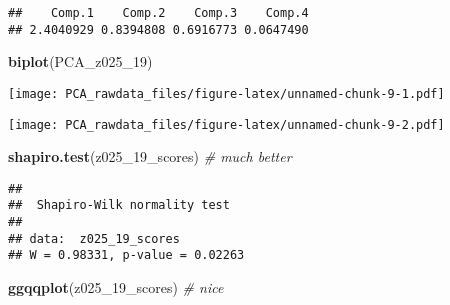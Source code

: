 \documentclass[]{article}
\newenvironment{Shaded}{\begin{snugshade}}{\end{snugshade}}
\newcommand{\CommentTok}[1]{\textcolor[rgb]{0.56,0.35,0.01}{\textit{#1}}}
\newcommand{\DecValTok}[1]{\textcolor[rgb]{0.00,0.00,0.81}{#1}}
\newcommand{\KeywordTok}[1]{\textcolor[rgb]{0.13,0.29,0.53}{\textbf{#1}}}
\newcommand{\NormalTok}[1]{#1}
\newcommand{\OperatorTok}[1]{\textcolor[rgb]{0.81,0.36,0.00}{\textbf{#1}}}
\newcommand{\StringTok}[1]{\textcolor[rgb]{0.31,0.60,0.02}{#1}}
\begin{document}
\begin{Shaded}
\end{Shaded}

\begin{verbatim}
##    Comp.1    Comp.2    Comp.3    Comp.4 
## 2.4040929 0.8394808 0.6916773 0.0647490
\end{verbatim}

\begin{Shaded}
\begin{Highlighting}[]
\KeywordTok{biplot}\NormalTok{(PCA_z025_}\DecValTok{19}\NormalTok{)}
\end{Highlighting}
\end{Shaded}

\texttt{[image: PCA\_rawdata\_files/figure-latex/unnamed-chunk-9-1.pdf]}

\begin{Shaded}
\end{Shaded}

\texttt{[image: PCA\_rawdata\_files/figure-latex/unnamed-chunk-9-2.pdf]}

\begin{Shaded}
\begin{Highlighting}[]
\KeywordTok{shapiro.test}\NormalTok{(z025_}\DecValTok{19}\NormalTok{_scores) }\CommentTok{# much better}
\end{Highlighting}
\end{Shaded}

\begin{verbatim}
## 
##  Shapiro-Wilk normality test
## 
## data:  z025_19_scores
## W = 0.98331, p-value = 0.02263
\end{verbatim}

\begin{Shaded}
\begin{Highlighting}[]
\KeywordTok{ggqqplot}\NormalTok{(z025_}\DecValTok{19}\NormalTok{_scores) }\CommentTok{# nice}
\end{Highlighting}
\end{Shaded}
\end{document}
